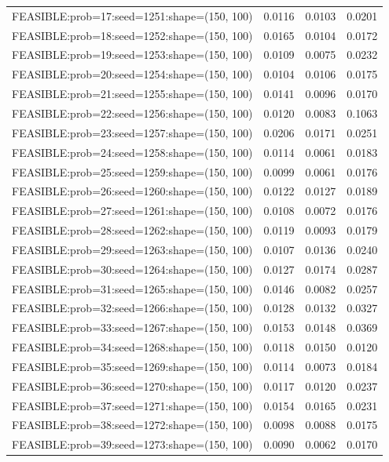 \begin{longtable}{lccc}
FEASIBLE:prob=17:seed=1251:shape=(150, 100)  &   0.0116 & 0.0103 & 0.0201 \\
FEASIBLE:prob=18:seed=1252:shape=(150, 100)  &   0.0165 & 0.0104 & 0.0172 \\
FEASIBLE:prob=19:seed=1253:shape=(150, 100)  &   0.0109 & 0.0075 & 0.0232 \\
FEASIBLE:prob=20:seed=1254:shape=(150, 100)  &   0.0104 & 0.0106 & 0.0175 \\
FEASIBLE:prob=21:seed=1255:shape=(150, 100)  &   0.0141 & 0.0096 & 0.0170 \\
FEASIBLE:prob=22:seed=1256:shape=(150, 100)  &   0.0120 & 0.0083 & 0.1063 \\
FEASIBLE:prob=23:seed=1257:shape=(150, 100)  &   0.0206 & 0.0171 & 0.0251 \\
FEASIBLE:prob=24:seed=1258:shape=(150, 100)  &   0.0114 & 0.0061 & 0.0183 \\
FEASIBLE:prob=25:seed=1259:shape=(150, 100)  &   0.0099 & 0.0061 & 0.0176 \\
FEASIBLE:prob=26:seed=1260:shape=(150, 100)  &   0.0122 & 0.0127 & 0.0189 \\
FEASIBLE:prob=27:seed=1261:shape=(150, 100)  &   0.0108 & 0.0072 & 0.0176 \\
FEASIBLE:prob=28:seed=1262:shape=(150, 100)  &   0.0119 & 0.0093 & 0.0179 \\
FEASIBLE:prob=29:seed=1263:shape=(150, 100)  &   0.0107 & 0.0136 & 0.0240 \\
FEASIBLE:prob=30:seed=1264:shape=(150, 100)  &   0.0127 & 0.0174 & 0.0287 \\
FEASIBLE:prob=31:seed=1265:shape=(150, 100)  &   0.0146 & 0.0082 & 0.0257 \\
FEASIBLE:prob=32:seed=1266:shape=(150, 100)  &   0.0128 & 0.0132 & 0.0327 \\
FEASIBLE:prob=33:seed=1267:shape=(150, 100)  &   0.0153 & 0.0148 & 0.0369 \\
FEASIBLE:prob=34:seed=1268:shape=(150, 100)  &   0.0118 & 0.0150 & 0.0120 \\
FEASIBLE:prob=35:seed=1269:shape=(150, 100)  &   0.0114 & 0.0073 & 0.0184 \\
FEASIBLE:prob=36:seed=1270:shape=(150, 100)  &   0.0117 & 0.0120 & 0.0237 \\
FEASIBLE:prob=37:seed=1271:shape=(150, 100)  &   0.0154 & 0.0165 & 0.0231 \\
FEASIBLE:prob=38:seed=1272:shape=(150, 100)  &   0.0098 & 0.0088 & 0.0175 \\
FEASIBLE:prob=39:seed=1273:shape=(150, 100)  &   0.0090 & 0.0062 & 0.0170 \\

\end{longtable}

